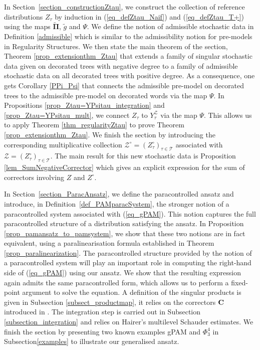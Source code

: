 \documentclass[11pt]{preprint}
\newcommand{\mcZ}{\mathcal{Z}}
\newcommand{\mcT}{\mathcal{T}}
\newcounter{theorem}
\def\PPi{\boldsymbol{\Pi}}
\def\eqref#1{(\ref{#1})}
\newcommand{\bfC}{{\bf C}}
\begin{document}
	

	In Section~\ref{section_constructionZtau}, we construct the collection of reference distributions $Z_\tau$ by induction in \eqref{eq_defZtau_Naif} and \eqref{eq_defZtau_T+} using the maps $ \widetilde{\PPi} $, $ \widetilde{g} $ and $\Psi$. We define the notion of admissible stochastic data in Definition \ref{admissible} which is similar to the admissibility notion for pre-models in Regularity Structures. We then state the main theorem of the section, Theorem \ref{prop_extensionthm_Ztau} that extends a family of singular stochastic data given on decorated trees with negative degree to a family of admissible stochastic data on all decorated trees with positive degree. As a consequence, one gets Corollary \ref{PPi_Psi} that connects the admissible pre-model on decorated trees to the admissible pre-model on decorated words via the map $\Psi$.
	 In Propositions \ref{prop_Ztau=YPsitau_integration} and  \ref{prop_Ztau=YPsitau_mult}, we connect $Z_{\tau}$ to $ Y_{\tau}^{\mathcal{Z}} $ via the map $\Psi$. This allows us to apply Theorem \ref{thm_regularityZtau} to prove Theorem \ref{prop_extensionthm_Ztau}. We finish the section by introducing the corresponding multiplicative collection $\mcZ^\circ=(Z^\circ_\tau)_{\tau\in\mcT}$ associated with $\mcZ=(Z^\circ_\tau)_{\tau\in\mcT}$. The main result for this new stochastic data is Proposition \ref{lem_SumNegativeCorrector} which gives an explicit expression for the sum of correctors involving $Z$ and $Z^{\circ}$. 
	 
In Section~\ref{section_ParacAnsatz}, we define the paracontrolled ansatz and introduce, in Definition~\ref{def_PAMparacSystem}, the stronger notion of a paracontrolled system associated with \eqref{eq_gPAM}. This notion captures the full paracontrolled structure of a distribution satisfying the ansatz. In Proposition \ref{prop_pamansatz_to_pamsystem}, we show that these two notions are in fact equivalent, using a paralinearisation formula established in Theorem \ref{prop_paralinearization}. The paracontrolled structure provided by the notion of a paracontrolled system will play an important role in computing the right-hand side of \eqref{eq_gPAM} using our ansatz. We show that the resulting expression again admits the same paracontrolled form, which allows us to perform a fixed-point argument to solve the equation. A definition of the singular products is given in Subsection \ref{subsect_productmap}, it relies on the correctors $\bfC$ introduced in \cite{LocalExpansionsParacSystems}. The integration step is carried out in Subsection \ref{subsection_integration} and relies on Hairer's multilevel Schauder estimates. We finish the section by presenting two known examples gPAM and $ \Phi^4_3 $ in Subsection\ref{examples} to illustrate our generalised ansatz.
\end{document}
